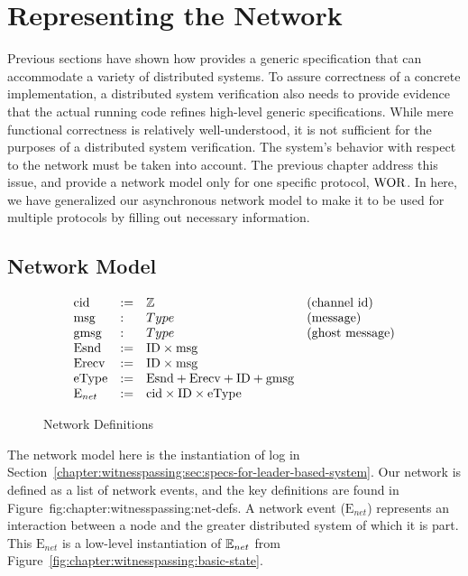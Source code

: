 \section{Representing the Network}
\label{chapter:witnesspassing:sec:low-level-implementation}

Previous sections have shown how \sysname{} provides a generic specification
that can accommodate a variety of distributed systems.  To assure correctness of
a concrete implementation, a distributed system verification also needs to
provide evidence that the actual running code refines high-level generic
specifications. While mere functional correctness is relatively well-understood,
it is not sufficient for the purposes of a distributed system verification. The
system's behavior with respect to the network must be taken into account. 
The previous chapter address this issue, and 
provide a network model only for one specific protocol, $\mathrm{WOR}$. 
In here, we have generalized our  asynchronous network model to make it to be used 
for multiple protocols by filling out necessary information. 


\subsection{Network Model}
\label{chapter:witnesspassing:subsec:network-model}

\begin{figure}
\begin{small}
\raggedright
$$
\begin{array}{llll}
\mathrm{cid} & := & \mathbb{Z} & \mbox{(channel id)} \\
\mathrm{msg} & : & Type & \mbox{(message)} \\
\mathrm{gmsg} & : & Type & \mbox{(ghost message)} \\
\mathrm{Esnd} & := & \mathrm{ID} \times \mathrm{msg} \\
\mathrm{Erecv} & := & \mathrm{ID} \times \mathrm{msg} \\
\mathrm{eType} & := & \mathrm{Esnd} + \mathrm{Erecv} + \mathrm{ID} + \mathrm{gmsg} \\
\mathrm{E}_{net} & := & \mathrm{cid} \times \mathrm{ID} \times \mathrm{eType} \\
\end{array}
$$
\end{small}
\caption{Network Definitions}
\label{fig:chapter:witnesspassing:net-defs}
\end{figure}

The network model here is the instantiation of log in
 Section~\ref{chapter:witnesspassing:sec:specs-for-leader-based-system}. Our network is defined as a list of
network events, and the key definitions are found in Figure~{fig:chapter:witnesspassing:net-defs}. A
network event ($\mathrm{E}_{net}$) represents an interaction between a node and
the greater distributed system of which it is part. This $\mathrm{E}_{net}$ is a
low-level instantiation of ${\mathbb{E}_{net}}$ from Figure~\ref{fig:chapter:witnesspassing:basic-state}.

